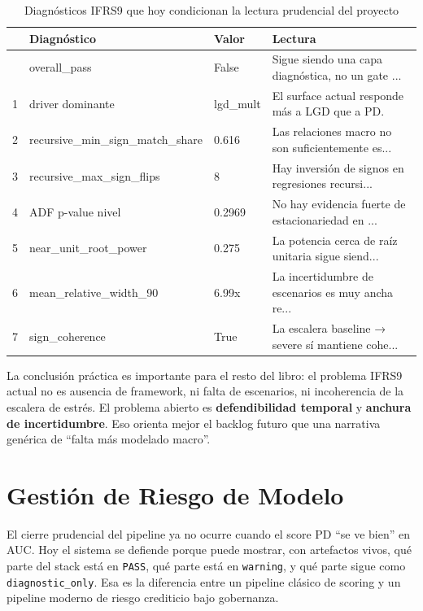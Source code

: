\documentclass[
  spanish,
  11pt,
  letterpaper,
]{scrbook}
\theoremstyle{plain}
\theoremstyle{remark}
\begin{document}
{

\begin{longtable}[]{@{}llll@{}}

\caption{\label{tbl-ifrs9-diagnostics}Diagnósticos IFRS9 que hoy
condicionan la lectura prudencial del proyecto}

\tabularnewline

\toprule\noalign{}
& Diagnóstico & Valor & Lectura \\
\midrule\noalign{}
\endhead
\bottomrule\noalign{}
\endlastfoot
0 & overall\_pass & False & Sigue siendo una capa diagnóstica, no un
gate ... \\
1 & driver dominante & lgd\_mult & El surface actual responde más a LGD
que a PD. \\
2 & recursive\_min\_sign\_match\_share & 0.616 & Las relaciones macro no
son suficientemente es... \\
3 & recursive\_max\_sign\_flips & 8 & Hay inversión de signos en
regresiones recursi... \\
4 & ADF p-value nivel & 0.2969 & No hay evidencia fuerte de
estacionariedad en ... \\
5 & near\_unit\_root\_power & 0.275 & La potencia cerca de raíz unitaria
sigue siend... \\
6 & mean\_relative\_width\_90 & 6.99x & La incertidumbre de escenarios
es muy ancha re... \\
7 & sign\_coherence & True & La escalera baseline → severe sí mantiene
cohe... \\

\end{longtable}

}

La conclusión práctica es importante para el resto del libro: el
problema IFRS9 actual no es ausencia de framework, ni falta de
escenarios, ni incoherencia de la escalera de estrés. El problema
abierto es \textbf{defendibilidad temporal} y \textbf{anchura de
incertidumbre}. Eso orienta mejor el backlog futuro que una narrativa
genérica de ``falta más modelado macro''.

\chapter{Gestión de Riesgo de Modelo}\label{sec-mrm}

El cierre prudencial del pipeline ya no ocurre cuando el score PD ``se
ve bien'' en AUC. Hoy el sistema se defiende porque puede mostrar, con
artefactos vivos, qué parte del stack está en \texttt{PASS}, qué parte
está en \texttt{warning}, y qué parte sigue como
\texttt{diagnostic\_only}. Esa es la diferencia entre un pipeline
clásico de scoring y un pipeline moderno de riesgo crediticio bajo
gobernanza.
\end{document}
